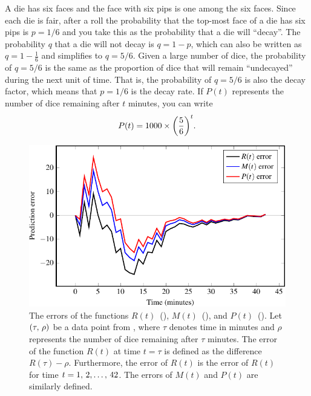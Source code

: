 \documentclass[a4paper,oneside,12pt]{article}
\begin{document}
\begin{problem}
{\begin{solution}
A die has six faces and the face with six pips is one among the six
faces.  Since each die is fair, after a roll the probability that the
top-most face of a die has six pips is $p = 1 / 6$ and you take this
as the probability that a die will ``decay''.  The probability $q$
that a die will not decay is $q = 1 - p$, which can also be written as
$q = 1 - \frac{1}{6}$ and simplifies to $q = 5 / 6$.  Given a large
number of dice, the probability of $q = 5 / 6$ is the same as the
proportion of dice that will remain ``undecayed'' during the next unit
of time.  That is, the probability of $q = 5 / 6$ is also the decay
factor, which means that $p = 1 / 6$ is the decay rate.  If $P(t)$
represents the number of dice remaining after $t$ minutes, you can
write
\begin{equation}
\label{eqn:exponential:radioactive_dice_probability}
P(t)
=
1000
\times
\parenthesis*{\frac{5}{6}}^t.
\end{equation}

\begin{figure}[!htbp]
\centering
\includegraphics[scale=1.1]{image/11/radioactive-dice-error.pdf}
\caption{%
  The errors of the functions
  $R(t)$~(),
  $M(t)$~(),
  and
  $P(t)$~().
  Let $\left\lparen{\tau},\, {\rho}\right\rparen$ be a data point from
  , where $\tau$ denotes time
  in minutes and $\rho$ represents the number of dice remaining after
  $\tau$ minutes.  The error of the function $R(t)$ at time $t = \tau$
  is defined as the difference $R(\tau) - \rho$.  Furthermore, the
  error of $R(t)$ is the error of $R(t)$ for time
  $t = {1},\, {2}, \dots,\, {42}$.  The errors of $M(t)$ and $P(t)$ are similarly
  defined.
}
\label{fig:exponential:radioactive_dice_errors}
\end{figure}


\end{solution}}
\end{problem}
\end{document}
